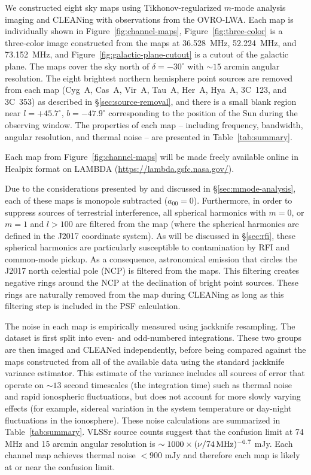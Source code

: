 \documentclass[twocolumn]{aastex61}
\begin{document}
We constructed eight sky maps using Tikhonov-regularized $m$-mode analysis imaging and CLEANing with
observations from the OVRO-LWA. Each map is individually shown in Figure~\ref{fig:channel-maps},
Figure~\ref{fig:three-color} is a three-color image constructed from the maps at 36.528~MHz,
52.224~MHz, and 73.152~MHz, and Figure~\ref{fig:galactic-plane-cutout} is a cutout of the galactic
plane. The maps cover the sky north of $\delta=-30^\circ$ with $\sim 15$ arcmin angular resolution.
The eight brightest northern hemisphere point sources are removed from each map (Cyg~A, Cas~A,
Vir~A, Tau~A, Her~A, Hya~A, 3C~123, and 3C~353) as described in \S\ref{sec:source-removal}, and
there is a small blank region near $l=+45.7^\circ$, $b=-47.9^\circ$ corresponding to the position of
the Sun during the observing window. The properties of each map -- including frequency, bandwidth,
angular resolution, and thermal noise -- are presented in Table~\ref{tab:summary}.

Each map from Figure~\ref{fig:channel-maps} will be made freely available online in Healpix format
\citep{2005ApJ...622..759G} on LAMBDA (\url{https://lambda.gsfc.nasa.gov/}).

Due to the considerations presented by \citet{2016ApJ...826..116V} and discussed in
\S\ref{sec:mmode-analysis}, each of these maps is monopole subtracted ($a_{00}=0$).  Furthermore, in
order to suppress sources of terrestrial interference, all spherical harmonics with $m=0$, or $m=1$
and $l>100$ are filtered from the map (where the spherical harmonics are defined in the J2017
coordinate system). As will be discussed in \S\ref{sec:rfi}, these spherical harmonics are
particularly susceptible to contamination by RFI and common-mode pickup. As a consequence,
astronomical emission that circles the J2017 north celestial pole (NCP) is filtered from the maps.
This filtering creates negative rings around the NCP at the declination of bright point sources.
These rings are naturally removed from the map during CLEANing as long as this filtering step is
included in the PSF calculation.

The noise in each map is empirically measured using jackknife resampling. The dataset is first split
into even- and odd-numbered integrations. These two groups are then imaged and CLEANed
independently, before being compared against the maps constructed from all of the available data
using the standard jackknife variance estimator. This estimate of the variance includes all sources
of error that operate on $\sim13$ second timescales (the integration time) such as thermal noise and
rapid ionospheric fluctuations, but does not account for more slowly varying effects (for example,
sidereal variation in the system temperature or day-night fluctuations in the ionosphere). These
noise calculations are summarized in Table~\ref{tab:summary}.  VLSSr source counts
\citep{2014MNRAS.440..327L} suggest that the confusion limit at 74 MHz and 15 arcmin angular
resolution is $\sim 1000\times(\nu/74\,{\rm MHz})^{-0.7}$ mJy.  Each channel map achieves thermal
noise $<900$ mJy and therefore each map is likely at or near the confusion limit.
\end{document}
